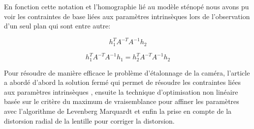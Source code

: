  
 
 En fonction cette notation et  l'homographie lié au modèle sténopé nous avons pu voir les contraintes de base liées aux paramètres intrinsèques lors de l'observation d'un seul plan qui sont entre autre:  
 
 \begin{equation} 
 h_{1}^{T} 
 A^{-T}
 A^{-1}
 h_2
 \label{eq:contrainte1}
 \end{equation}
 
 \begin{equation} 
 h_{1}^{T} 
 A^{-T}
 A^{-1}
 h_1
 =
 h_{2}^{T} 
 A^{-T}
 A^{-1}
 h_2
 \label{eq:contrainte2}
 \end{equation}
 
 Pour résoudre de manière efficace le problème d'étalonnage de la caméra, l'article a abordé d'abord la solution fermé qui permet de résoudre les contraintes liées aux paramètres intrinsèques , ensuite la technique d'optimisation non linéaire basée sur le critère du maximum de vraisemblance pour affiner les paramètres avec l'algorithme de Levenberg ­Marquardt et enfin la prise en compte de la distorsion radial de la lentille pour corriger la distorsion.
 
